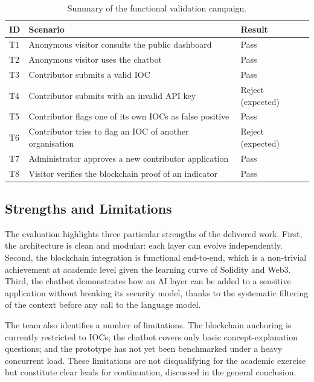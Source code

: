 \documentclass[12pt,a4paper,oneside]{book}
\begin{document}
{{\begin{table}[!h]
\caption{Summary of the functional validation campaign.}
\label{tab:tests}
\centering
\renewcommand{\arraystretch}{1.35}
\begin{tabular}{| C{.08\textwidth} | p{.65\textwidth} | C{.17\textwidth} |}
\hline
\textbf{ID} & \textbf{Scenario} & \textbf{Result} \\
\hline\hline
T1 & \nohyphens{Anonymous visitor consults the public dashboard}          & Pass \\
\hline
T2 & \nohyphens{Anonymous visitor uses the chatbot}                       & Pass \\
\hline
T3 & \nohyphens{Contributor submits a valid IOC}                          & Pass \\
\hline
T4 & \nohyphens{Contributor submits with an invalid API key}              & Reject (expected) \\
\hline
T5 & \nohyphens{Contributor flags one of its own IOCs as false positive}  & Pass \\
\hline
T6 & \nohyphens{Contributor tries to flag an IOC of another organisation} & Reject (expected) \\
\hline
T7 & \nohyphens{Administrator approves a new contributor application}     & Pass \\
\hline
T8 & \nohyphens{Visitor verifies the blockchain proof of an indicator}    & Pass \\
\hline
\end{tabular}
\end{table}

\subsection{Strengths and Limitations}

The evaluation highlights three particular strengths of the delivered work.
First, the architecture is clean and modular: each layer can evolve
independently. Second, the blockchain integration is functional end-to-end,
which is a non-trivial achievement at academic level given the learning
curve of Solidity and Web3. Third, the chatbot demonstrates how an AI
layer can be added to a sensitive application without breaking its security
model, thanks to the systematic filtering of the context before any call to
the language model.

The team also identifies a number of limitations. The blockchain anchoring
is currently restricted to IOCs; the chatbot covers only basic
concept-explanation questions; and the prototype has not yet been
benchmarked under a heavy concurrent load. These limitations are not
disqualifying for the academic exercise but constitute clear leads for
continuation, discussed in the general conclusion.

}}
\end{document}
